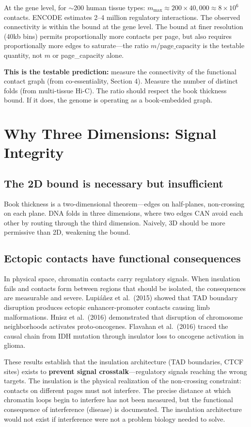 \documentclass[11pt]{article}
\theoremstyle{definition}
\begin{document}
At the gene level, for $\sim$200 human tissue types: $m_{\max} \approx 200 \times 40{,}000 \approx 8 \times 10^6$ contacts. ENCODE estimates 2--4 million regulatory interactions. The observed connectivity is within the bound at the gene level. The bound at finer resolution (40kb bins) permits proportionally more contacts per page, but also requires proportionally more edges to saturate---the ratio $m/\text{page\_capacity}$ is the testable quantity, not $m$ or page\_capacity alone.

\textbf{This is the testable prediction:} measure the connectivity of the functional contact graph (from co-essentiality, Section 4). Measure the number of distinct folds (from multi-tissue Hi-C). The ratio should respect the book thickness bound. If it does, the genome is operating as a book-embedded graph.

\section{Why Three Dimensions: Signal Integrity}

\subsection{The 2D bound is necessary but insufficient}

Book thickness is a two-dimensional theorem---edges on half-planes, non-crossing on each plane. DNA folds in three dimensions, where two edges CAN avoid each other by routing through the third dimension. Naively, 3D should be more permissive than 2D, weakening the bound.

\subsection{Ectopic contacts have functional consequences}

In physical space, chromatin contacts carry regulatory signals. When insulation fails and contacts form between regions that should be isolated, the consequences are measurable and severe. Lupi\'{a}\~{n}ez et al.\ (2015) showed that TAD boundary disruption produces ectopic enhancer-promoter contacts causing limb malformations. Hnisz et al.\ (2016) demonstrated that disruption of chromosome neighborhoods activates proto-oncogenes. Flavahan et al.\ (2016) traced the causal chain from IDH mutation through insulator loss to oncogene activation in glioma.

These results establish that the insulation architecture (TAD boundaries, CTCF sites) exists to \textbf{prevent signal crosstalk}---regulatory signals reaching the wrong targets. The insulation is the physical realization of the non-crossing constraint: contacts on different pages must not interfere. The precise distance at which chromatin loops begin to interfere has not been measured, but the functional consequence of interference (disease) is documented. The insulation architecture would not exist if interference were not a problem biology needed to solve.
\end{document}
